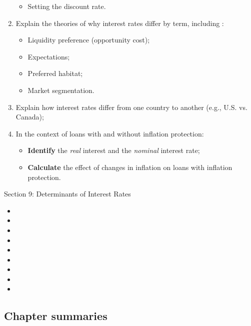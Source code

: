 \begin{outcomes}
\begin{enumerate}[label = \alph*), leftmargin = *]
\begin{itemize}[leftmargin = *]
		\item	Setting the discount rate.
		\end{itemize}
	\item	Explain the theories of why interest rates differ by term, including :
		\begin{itemize}[leftmargin = *]
		\item	Liquidity preference (opportunity cost);
		\item	Expectations;
		\item	Preferred habitat; 
		\item	Market segmentation.
		\end{itemize}
	\item	Explain how interest rates differ from one country to another (e.g., U.S. vs. Canada);
	\item	In the context of loans with and without inflation protection:
		\begin{itemize}[leftmargin = *]
		\item	\textbf{Identify} the \textit{real} interest and the \textit{nominal} interest rate;
		\item	\textbf{Calculate} the effect of changes in inflation on loans with inflation protection.
		\end{itemize}
\end{enumerate}
\end{outcomes}

\begin{ASM_chapter}
Section 9: Determinants of Interest Rates
\begin{itemize}[leftmargin = *]
	\item	{}
	\item	{}
	\item	{}
	\item	{}
	\item	{}
	\item	{}
	\item	{}
	\item	{}
	\item	{}
\end{itemize}
\end{ASM_chapter}

\subsection{Chapter summaries}


